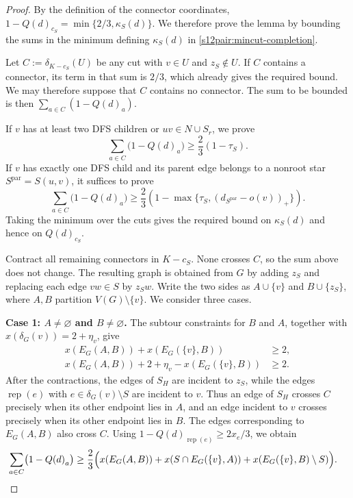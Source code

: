\documentclass[11pt]{amsart}
\newcommand{\rep}[1]{\operatorname{rep}(#1)}
\newcommand{\1}{\mathbbm{1}}
\begin{document}
\begin{proof}
By the definition of the connector coordinates,
$1-{Q(d)}_{c_S}=\min\{2/3,\kappa_S(d)\}$. We therefore prove
the lemma by bounding the sums in the minimum defining
$\kappa_S(d)$ in \eqref{s12pair:mincut-completion}.

Let $C:=\delta_{K-c_S}(U)$ be any cut with $v\in U$ and
$z_S\notin U$. If $C$ contains a connector, its term in
that sum is $2/3$, which already gives the required bound.
We may therefore suppose that $C$ contains no connector.
The sum to be bounded is then
$\sum_{a\in C}(1-{Q(d)}_a)$.

If $v$ has at least two DFS children or $uv\in N\cup S_r$,
we prove
\[
 \sum_{a\in C}\bigl(1-{Q(d)}_a\bigr)
 \ge\frac23(1-\tau_S).
\]
If $v$ has exactly one DFS child and its parent edge belongs
to a nonroot star $S^{\mathrm{par}}=S(u,v)$, it suffices to prove
\[
 \sum_{a\in C}\bigl(1-{Q(d)}_a\bigr)
 \ge\frac23\left(1-\max\{\tau_S,(d_{S^{\mathrm{par}}}-o(v))_+\}\right).
\]
Taking the minimum over the cuts gives the required bound
on $\kappa_S(d)$ and hence on ${Q(d)}_{c_S}$.

Contract all remaining connectors in $K-c_S$. None crosses
$C$, so the sum above does not change. The resulting graph is obtained from $G$ by adding $z_S$
and replacing each edge $vw\in S$ by $z_Sw$. Write the two sides as $A\cup\{v\}$ and
$B\cup\{z_S\}$, where $A,B$ partition
$V(G)\setminus\{v\}$. We consider three cases.

\smallskip\noindent
\textbf{Case 1: $A\ne\varnothing$ and $B\ne\varnothing$.}
The subtour constraints for $B$ and $A$, together with
$x(\delta_G(v))=2+\eta_v$, give
\[
 \begin{aligned}
 x(E_G(A,B))+x(E_G(\{v\},B))&\ge2,\\
 x(E_G(A,B))+2+\eta_v-x(E_G(\{v\},B))&\ge2.
 \end{aligned}
\]
After the contractions, the edges of $S_H$ are incident to
$z_S$, while the edges $\rep{e}$ with
$e\in\delta_G(v)\setminus S$ are incident to $v$.
Thus an edge of $S_H$ crosses $C$ precisely when its other
endpoint lies in $A$, and an edge incident to $v$ crosses
precisely when its other endpoint lies in $B$.
The edges corresponding to $E_G(A,B)$ also cross $C$.
Using $1-{Q(d)}_{\rep{e}}\ge2x_e/3$, we obtain
\[
 \begin{aligned}
 \sum_{a\in C}\bigl(1-{Q(d)}_a\bigr)
 \ge\frac23\Bigl(
   &x(E_G(A,B))
    +x(S\cap E_G(\{v\},A))
   +x(E_G(\{v\},B)\setminus S)
 \Bigr).
 \end{aligned}
\]


\end{proof}
\end{document}
